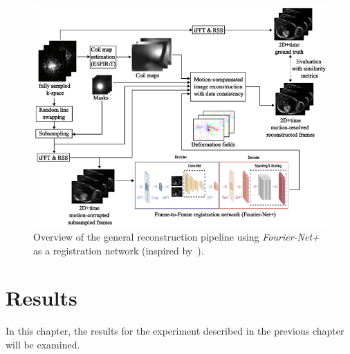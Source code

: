 \documentclass[english,version-2022-01]{uzl-thesis} %
\begin{document}
\begin{figure}[htpb]
	\centering
	\graphicspath{{images/}{\main/images/}}
	\includegraphics[width=\linewidth]{ReconstructionPipelineEvaluation.png} 
	\caption{Overview of the general reconstruction pipeline using \emph{Fourier-Net+} as a registration network (inspired by~\cite{Kuestner2022}).}
	\label{fig:ReconstructionPipeline}
\end{figure}



\chapter{Results} \label{Ch:Results}
In this chapter, the results for the experiment described in the previous chapter will be examined. 

\end{document}
